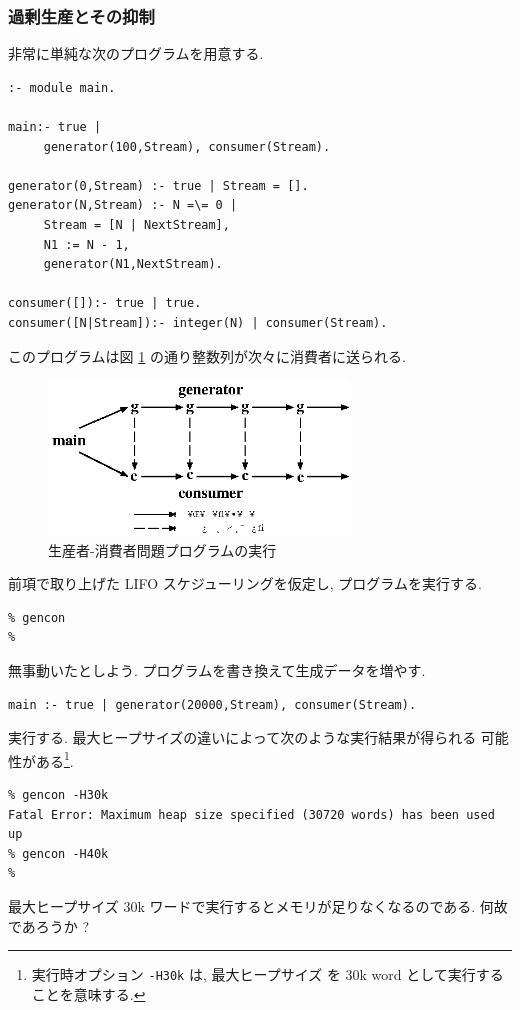 \documentclass[a4,titlepage]{jsreport}
\begin{document}
\subsubsection{過剰生産とその抑制}
非常に単純な次のプログラムを用意する.  

\begin{center}
\begin{minipage}{12cm}\label{gencon}
\begin{Verbatim}[baselinestretch=0.8]
%  gencon.kl1
:- module main.

main:- true |
     generator(100,Stream), consumer(Stream).

generator(0,Stream) :- true | Stream = [].
generator(N,Stream) :- N =\= 0 |
     Stream = [N | NextStream],
     N1 := N - 1,
     generator(N1,NextStream).

consumer([]):- true | true.
consumer([N|Stream]):- integer(N) | consumer(Stream).
\end{Verbatim}
\end{minipage}
\end{center}

このプログラムは図 \ref{prio1-2} の通り整数列が次々に消費者に送られる.  
\begin{figure}[h]
\begin{center}
\includegraphics[width=8cm]{fig/pri1-2.eps}
\caption{生産者-消費者問題プログラムの実行}\label{prio1-2}
\end{center}
\end{figure}

前項で取り上げた
LIFO スケジューリングを仮定し, プログラムを実行する.
\begin{Verbatim}[frame=single,baselinestretch=0.8]
% klic -o gencon gencon.kl1
% gencon
%
\end{Verbatim}
無事動いたとしよう.  プログラムを書き換えて生成データを増やす.  
\begin{verbatim}
main :- true | generator(20000,Stream), consumer(Stream).
\end{verbatim}
実行する.  最大ヒープサイズの違いによって次のような実行結果が得られる
可能性がある\footnote{実行時オプション \texttt{-H30k} は, 最大ヒープサイズ
を 30k word として実行することを意味する.}.
\begin{Verbatim}[frame=single,baselinestretch=0.8]
% klic -o gencon gencon.kl1
% gencon -H30k
Fatal Error: Maximum heap size specified (30720 words) has been used up
% gencon -H40k
%
\end{Verbatim}
最大ヒープサイズ 30k ワードで実行するとメモリが足りなくなるのである.  
何故であろうか ?
\end{document}
